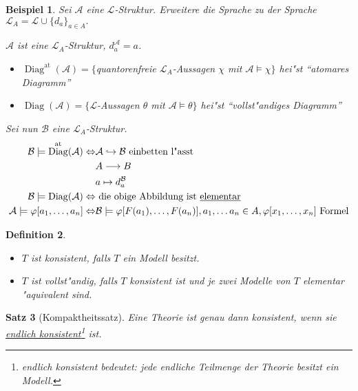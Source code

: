 \documentclass[a4paper,12pt,numbers=noenddot,parskip=full]{scrartcl}
\newcommand{\scrL}{\mathcal{L}}
\newcommand{\scrA}{\mathcal{A}}
\newcommand{\scrB}{\mathcal{B}}
\DeclareMathOperator{\Diag}{Diag}
\newcommand{\atdig}{\Diag^{\text{at}}}
\newcommand{\vdig}{\Diag}
\theoremstyle{dotless}
\newtheorem{theorem}{Satz}[section]
\newtheorem{definition}[theorem]{Definition}
\newtheorem{example}[theorem]{Beispiel}
\theoremstyle{remark}
\begin{document}
\begin{example}
	Sei $\scrA$ eine $\scrL$-Struktur. Erweitere die Sprache zu der Sprache $\scrL_A = \scrL \cup \{d_a\}_{a \in A}.$
	
	$\scrA$ ist eine $\scrL_A$-Struktur, $d_a^\scrA = a$.
	\begin{itemize}
		\item $\atdig(\scrA) = \{$quantorenfreie $\scrL_A$-Aussagen $\chi$ mit $\scrA \models \chi\}$ hei"st "`atomares Diagramm"'
		\item $\vdig (\scrA) = \{\scrL$-Aussagen $\theta$ mit $\scrA \models \theta\}$ hei"st "`vollst"andiges Diagramm"'
	\end{itemize}
	Sei nun $\scrB$ eine $\scrL_A$-Struktur.
	\begin{align*}
		\scrB \models \atdig(\scrA) \Leftrightarrow &\scrA \hookrightarrow \scrB \text{ einbetten l"asst}\\
		&A \longrightarrow B\\
		&a \mapsto d_a^\scrB\\
		\scrB \models \vdig(\scrA) \Leftrightarrow &\text{ die obige Abbildung ist \underline{elementar}}\\
		\scrA \models \varphi[a_1, \dots, a_n] \Leftrightarrow &\scrB \models \varphi [F(a_1), \dots, F(a_n)], a_1, \dots a_n \in A, \varphi[x_1, \dots, x_n] \text{ Formel}
	\end{align*}
\end{example}

\begin{definition}
	\begin{itemize}
		\item $T$ ist konsistent, falls $T$ ein Modell besitzt.
		\item $T$ ist vollst"andig, falls  $T$ konsistent ist und je zwei Modelle von $T$ elementar "aquivalent sind.
	\end{itemize}
\end{definition}

\begin{theorem}[Kompaktheitssatz]
	Eine Theorie ist genau dann konsistent, wenn sie \underline{endlich konsistent}\footnote{endlich konsistent bedeutet: jede endliche Teilmenge der Theorie besitzt ein Modell.} ist.
\end{theorem}
\end{document}
